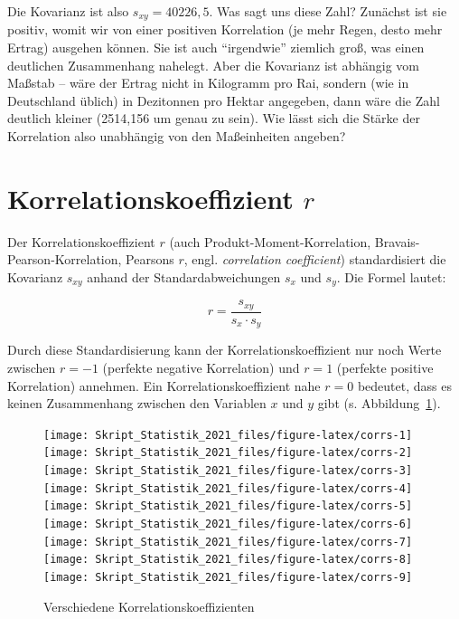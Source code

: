 \documentclass[
  11pt,
  ngerman,
  a4paper,
]{report}
\begin{document}
Die Kovarianz ist also \(s_{xy}=40226{,}5\). Was sagt uns diese Zahl? Zunächst ist sie positiv, womit wir von einer positiven Korrelation (je mehr Regen, desto mehr Ertrag) ausgehen können. Sie ist auch \enquote{irgendwie} ziemlich groß, was einen deutlichen Zusammenhang nahelegt. Aber die Kovarianz ist abhängig vom Maßstab -- wäre der Ertrag nicht in Kilogramm pro Rai, sondern (wie in Deutschland üblich) in Dezitonnen pro Hektar angegeben, dann wäre die Zahl deutlich kleiner (2514,156 um genau zu sein). Wie lässt sich die Stärke der Korrelation also unabhängig von den Maßeinheiten angeben?

\hypertarget{korrelationskoeffizient}{%
\section{\texorpdfstring{Korrelationskoeffizient \(r\)}{Korrelationskoeffizient r}}\label{korrelationskoeffizient}}

Der Korrelationskoeffizient \(r\) (auch Produkt-Moment-Korrelation, Bravais-Pearson-Korrelation, Pearsons \(r\), engl. \emph{correlation coefficient}) standardisiert die Kovarianz \(s_{xy}\) anhand der Standardabweichungen \(s_x\) und \(s_y\). Die Formel lautet:

\[
r=\frac{s_{xy}}{s_x\cdot s_y}
\label{eq:cor}
\]

Durch diese Standardisierung kann der Korrelationskoeffizient nur noch Werte zwischen \(r=-1\) (perfekte negative Korrelation) und \(r=1\) (perfekte positive Korrelation) annehmen. Ein Korrelationskoeffizient nahe \(r=0\) bedeutet, dass es keinen Zusammenhang zwischen den Variablen \(x\) und \(y\) gibt (s. Abbildung~\ref{fig:corrs}).

\begin{figure}[!h]

{\centering \texttt{[image: Skript\_Statistik\_2021\_files/figure-latex/corrs-1]} \texttt{[image: Skript\_Statistik\_2021\_files/figure-latex/corrs-2]} \texttt{[image: Skript\_Statistik\_2021\_files/figure-latex/corrs-3]} \texttt{[image: Skript\_Statistik\_2021\_files/figure-latex/corrs-4]} \texttt{[image: Skript\_Statistik\_2021\_files/figure-latex/corrs-5]} \texttt{[image: Skript\_Statistik\_2021\_files/figure-latex/corrs-6]} \texttt{[image: Skript\_Statistik\_2021\_files/figure-latex/corrs-7]} \texttt{[image: Skript\_Statistik\_2021\_files/figure-latex/corrs-8]} \texttt{[image: Skript\_Statistik\_2021\_files/figure-latex/corrs-9]} 

}

\caption{Verschiedene Korrelationskoeffizienten}\label{fig:corrs}
\end{figure}
\end{document}
